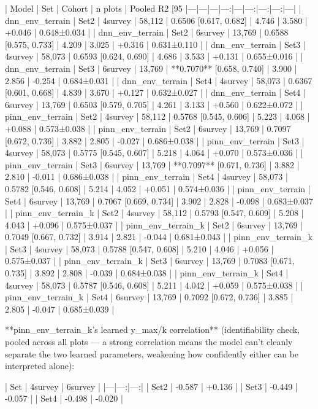 | Model | Set | Cohort | n plots | Pooled R2 [95%
|---|---|---|---:|---|---:|---:|---:|---|
| dnn_env_terrain | Set2 | 4survey | 58,112 | 0.6506 [0.617, 0.682] | 4.746 | 3.580 | +0.046 | 0.648±0.034 |
| dnn_env_terrain | Set2 | 6survey | 13,769 | 0.6588 [0.575, 0.733] | 4.209 | 3.025 | +0.316 | 0.631±0.110 |
| dnn_env_terrain | Set3 | 4survey | 58,073 | 0.6593 [0.624, 0.690] | 4.686 | 3.533 | +0.131 | 0.655±0.016 |
| dnn_env_terrain | Set3 | 6survey | 13,769 | **0.7070** [0.658, 0.740] | 3.900 | 2.856 | -0.254 | 0.684±0.031 |
| dnn_env_terrain | Set4 | 4survey | 58,073 | 0.6367 [0.601, 0.668] | 4.839 | 3.670 | +0.127 | 0.632±0.027 |
| dnn_env_terrain | Set4 | 6survey | 13,769 | 0.6503 [0.579, 0.705] | 4.261 | 3.133 | +0.560 | 0.622±0.072 |
| pinn_env_terrain | Set2 | 4survey | 58,112 | 0.5768 [0.545, 0.606] | 5.223 | 4.068 | +0.088 | 0.573±0.038 |
| pinn_env_terrain | Set2 | 6survey | 13,769 | 0.7097 [0.672, 0.736] | 3.882 | 2.805 | -0.027 | 0.686±0.038 |
| pinn_env_terrain | Set3 | 4survey | 58,073 | 0.5775 [0.545, 0.607] | 5.218 | 4.064 | +0.070 | 0.573±0.036 |
| pinn_env_terrain | Set3 | 6survey | 13,769 | **0.7097** [0.671, 0.736] | 3.882 | 2.810 | -0.011 | 0.686±0.038 |
| pinn_env_terrain | Set4 | 4survey | 58,073 | 0.5782 [0.546, 0.608] | 5.214 | 4.052 | +0.051 | 0.574±0.036 |
| pinn_env_terrain | Set4 | 6survey | 13,769 | 0.7067 [0.669, 0.734] | 3.902 | 2.828 | -0.098 | 0.683±0.037 |
| pinn_env_terrain_k | Set2 | 4survey | 58,112 | 0.5793 [0.547, 0.609] | 5.208 | 4.043 | +0.096 | 0.575±0.037 |
| pinn_env_terrain_k | Set2 | 6survey | 13,769 | 0.7049 [0.667, 0.732] | 3.914 | 2.821 | -0.044 | 0.681±0.043 |
| pinn_env_terrain_k | Set3 | 4survey | 58,073 | 0.5788 [0.547, 0.608] | 5.210 | 4.046 | +0.056 | 0.575±0.037 |
| pinn_env_terrain_k | Set3 | 6survey | 13,769 | 0.7083 [0.671, 0.735] | 3.892 | 2.808 | -0.039 | 0.684±0.038 |
| pinn_env_terrain_k | Set4 | 4survey | 58,073 | 0.5787 [0.546, 0.608] | 5.211 | 4.042 | +0.059 | 0.575±0.038 |
| pinn_env_terrain_k | Set4 | 6survey | 13,769 | 0.7092 [0.672, 0.736] | 3.885 | 2.805 | -0.047 | 0.685±0.039 |

**pinn_env_terrain_k's learned y_max/k correlation** (identifiability check, pooled across all
plots — a strong correlation means the model can't cleanly separate the two learned parameters,
weakening how confidently either can be interpreted alone):

| Set | 4survey | 6survey |
|---|---:|---:|
| Set2 | -0.587 | +0.136 |
| Set3 | -0.449 | -0.057 |
| Set4 | -0.498 | -0.020 |

